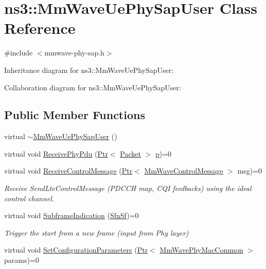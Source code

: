 \hypertarget{classns3_1_1MmWaveUePhySapUser}{}\section{ns3\+:\+:Mm\+Wave\+Ue\+Phy\+Sap\+User Class Reference}
\label{classns3_1_1MmWaveUePhySapUser}


{\ttfamily \#include $<$mmwave-\/phy-\/sap.\+h$>$}



Inheritance diagram for ns3\+:\+:Mm\+Wave\+Ue\+Phy\+Sap\+User\+:


Collaboration diagram for ns3\+:\+:Mm\+Wave\+Ue\+Phy\+Sap\+User\+:
\subsection*{Public Member Functions}
\begin{DoxyCompactItemize}
\item 
virtual \hyperlink{classns3_1_1MmWaveUePhySapUser_a01e351d1d92cb6dcf34743b32140b68a}{$\sim$\+Mm\+Wave\+Ue\+Phy\+Sap\+User} ()
\item 
virtual void \hyperlink{classns3_1_1MmWaveUePhySapUser_ace15ae3dc227b7d0f9acf617ebd92eb7}{Receive\+Phy\+Pdu} (\hyperlink{classns3_1_1Ptr}{Ptr}$<$ \hyperlink{classns3_1_1Packet}{Packet} $>$ \hyperlink{lte__link__budget__x2__handover__measures_8m_ac9de518908a968428863f829398a4e62}{p})=0
\item 
virtual void \hyperlink{classns3_1_1MmWaveUePhySapUser_aef4c1ae33a2b23ef03df4e109169895c}{Receive\+Control\+Message} (\hyperlink{classns3_1_1Ptr}{Ptr}$<$ \hyperlink{classns3_1_1MmWaveControlMessage}{Mm\+Wave\+Control\+Message} $>$ msg)=0
\begin{DoxyCompactList}\small\item\em Receive Send\+Lte\+Control\+Message (P\+D\+C\+CH map, C\+QI feedbacks) using the ideal control channel. \end{DoxyCompactList}\item 
virtual void \hyperlink{classns3_1_1MmWaveUePhySapUser_adff40de03e46f524e3334edc4e9ab016}{Subframe\+Indication} (\hyperlink{structns3_1_1SfnSf}{Sfn\+Sf})=0
\begin{DoxyCompactList}\small\item\em Trigger the start from a new frame (input from Phy layer) \end{DoxyCompactList}\item 
virtual void \hyperlink{classns3_1_1MmWaveUePhySapUser_a5fbbcdd188f30c4cb0bafac3eb057fd6}{Set\+Configuration\+Parameters} (\hyperlink{classns3_1_1Ptr}{Ptr}$<$ \hyperlink{classns3_1_1MmWavePhyMacCommon}{Mm\+Wave\+Phy\+Mac\+Common} $>$ params)=0
\end{DoxyCompactItemize}



